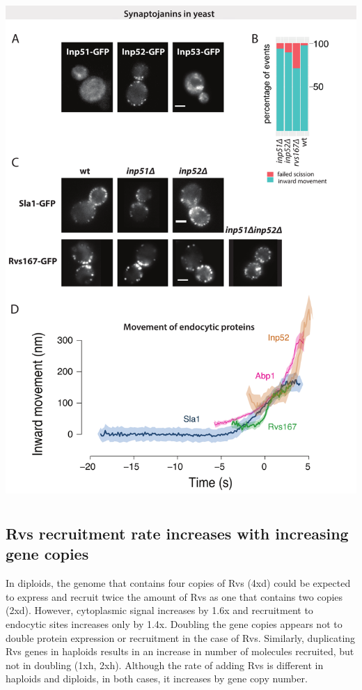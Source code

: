 	\includegraphics[width=19cm,height=19cm,keepaspectratio]{figures/results_final/inp}

\subsection{Rvs recruitment rate increases with increasing gene copies}
In diploids, the genome that contains four copies of Rvs (4xd) could be expected to express and recruit twice the amount of Rvs as one that contains two copies (2xd). However, cytoplasmic signal increases by 1.6x and recruitment to endocytic sites increases only by 1.4x. Doubling the gene copies appears not to double protein expression or recruitment in the case of Rvs. Similarly, duplicating Rvs genes in haploids results in an increase in number of molecules recruited, but not in doubling (1xh, 2xh). Although the rate of adding Rvs is different in haploids and diploids, in both cases, it increases by gene copy number. 


